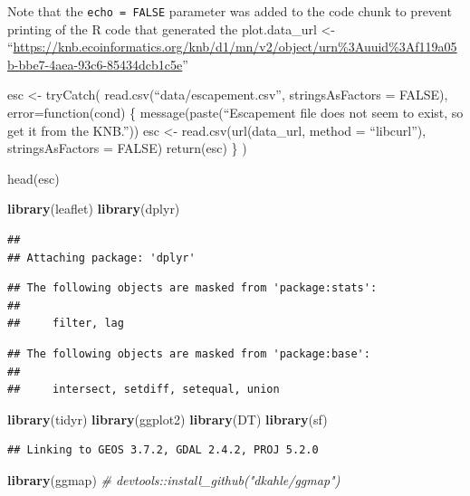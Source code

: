 \documentclass[]{article}
\newenvironment{Shaded}{\begin{snugshade}}{\end{snugshade}}
\newcommand{\CommentTok}[1]{\textcolor[rgb]{0.56,0.35,0.01}{\textit{#1}}}
\newcommand{\KeywordTok}[1]{\textcolor[rgb]{0.13,0.29,0.53}{\textbf{#1}}}
\newcommand{\NormalTok}[1]{#1}
\begin{document}
Note that the \texttt{echo\ =\ FALSE} parameter was added to the code
chunk to prevent printing of the R code that generated the
plot.data\_url \textless{}-
``\url{https://knb.ecoinformatics.org/knb/d1/mn/v2/object/urn\%3Auuid\%3Af119a05b-bbe7-4aea-93c6-85434dcb1c5e}''

esc \textless{}- tryCatch( read.csv(``data/escapement.csv'',
stringsAsFactors = FALSE), error=function(cond) \{
message(paste(``Escapement file does not seem to exist, so get it from
the KNB.'')) esc \textless{}- read.csv(url(data\_url, method =
``libcurl''), stringsAsFactors = FALSE) return(esc) \} )

head(esc)

\begin{Shaded}
\begin{Highlighting}[]
  \KeywordTok{library}\NormalTok{(leaflet)}
  \KeywordTok{library}\NormalTok{(dplyr)}
\end{Highlighting}
\end{Shaded}

\begin{verbatim}
## 
## Attaching package: 'dplyr'
\end{verbatim}

\begin{verbatim}
## The following objects are masked from 'package:stats':
## 
##     filter, lag
\end{verbatim}

\begin{verbatim}
## The following objects are masked from 'package:base':
## 
##     intersect, setdiff, setequal, union
\end{verbatim}

\begin{Shaded}
\begin{Highlighting}[]
  \KeywordTok{library}\NormalTok{(tidyr)}
  \KeywordTok{library}\NormalTok{(ggplot2)}
  \KeywordTok{library}\NormalTok{(DT)}
  \KeywordTok{library}\NormalTok{(sf)}
\end{Highlighting}
\end{Shaded}

\begin{verbatim}
## Linking to GEOS 3.7.2, GDAL 2.4.2, PROJ 5.2.0
\end{verbatim}

\begin{Shaded}
\begin{Highlighting}[]
  \KeywordTok{library}\NormalTok{(ggmap) }\CommentTok{# devtools::install_github("dkahle/ggmap")}
\end{Highlighting}
\end{Shaded}
\end{document}
